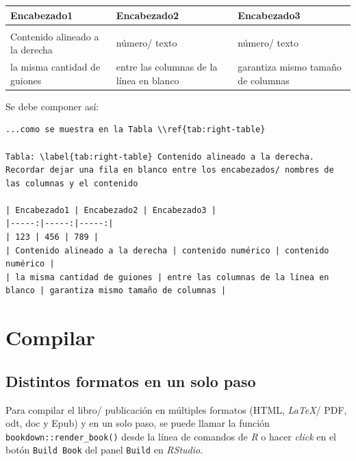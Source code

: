\documentclass[
]{krantz}
\begin{document}
\begin{longtable}[]{@{}
  >{\raggedleft\arraybackslash}p{}
  >{\raggedleft\arraybackslash}p{}
  >{\raggedleft\arraybackslash}p{}@{}}
\toprule
Encabezado1 & Encabezado2 & Encabezado3 \\
\midrule
\endhead
123 & 456 & 789 \\
Contenido alineado a la derecha & número/ texto & número/ texto \\
la misma cantidad de guiones & entre las columnas de la línea en blanco & garantiza mismo tamaño de columnas \\
\bottomrule
\end{longtable}

Se debe componer así:

\begin{verbatim}
...como se muestra en la Tabla \\ref{tab:right-table}

Tabla: \label{tab:right-table} Contenido alineado a la derecha. Recordar dejar una fila en blanco entre los encabezados/ nombres de las columnas y el contenido

| Encabezado1 | Encabezado2 | Encabezado3 |
|-----:|-----:|-----:|
| 123 | 456 | 789 |
| Contenido alineado a la derecha | contenido numérico | contenido numérico |
| la misma cantidad de guiones | entre las columnas de la línea en blanco | garantiza mismo tamaño de columnas |
\end{verbatim}

\hypertarget{compilar}{%
\chapter{Compilar}\label{compilar}}

\hypertarget{distintos-formatos-en-un-solo-paso}{%
\section{Distintos formatos en un solo paso}\label{distintos-formatos-en-un-solo-paso}}

Para compilar el libro/ publicación en múltiples formatos (HTML, \emph{LaTeX}/ PDF, odt, doc y Epub) y en un solo paso, se puede llamar la función \texttt{bookdown::render\_book()} desde la línea de comandos de \emph{R} o hacer \emph{click} en el botón \texttt{Build\ Book} del panel \texttt{Build} en \emph{RStudio}.
\end{document}
